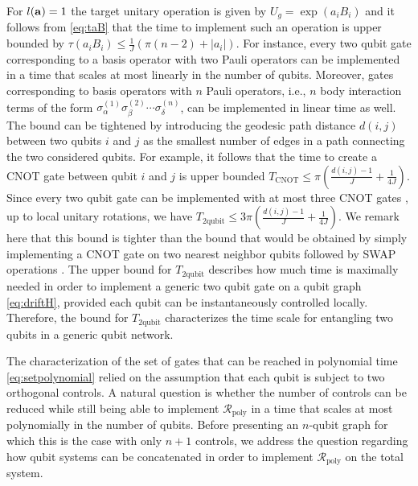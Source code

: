 \documentclass[aps,twocolumn,amsmath,amssymb,nofootinbib,superscriptaddress]{revtex4-1}
\begin{document}
 
 For $l(\bold{a})=1$ the target unitary operation is given by $U_{g}=\exp(a_{i}B_{i})$ and it follows from \eqref{eq:taB} that the time to implement such an operation is upper bounded by $\tau(a_{i}B_{i})\leq \frac{1}{J}(\pi(n-2)+|a_{i}|)$. For instance, every two qubit gate corresponding to a basis operator with two Pauli operators can be implemented in a time that scales at most linearly in the number of qubits. Moreover, gates corresponding to basis operators with $n$ Pauli operators, i.e., $n$ body interaction terms of the form $\sigma_{\alpha}^{(1)}\sigma_{\beta}^{(2)}\cdots\sigma_{\delta}^{(n)}$, can be implemented in linear time as well.
   The bound can be tightened by introducing the geodesic path distance $d(i,j)$ between two qubits $i$ and $j$ as the smallest number of edges in a path connecting the two considered qubits. For example, it follows that the time to create a CNOT gate between qubit $i$ and $j$ is upper bounded $T_{\text{CNOT}}\leq \pi\left(\frac{d(i,j)-1}{J}+\frac{1}{4J}\right)$. Since every two qubit gate can be implemented with at most three CNOT gates \cite{3CNOT}, up to local unitary rotations, we have
    $T_{\text{2qubit}}\leq 3\pi\left(\frac{ d(i,j)-1}{J}+\frac{1}{4J}	\right)$.
     We remark here that this bound is tighter than the bound that would be obtained by simply implementing a CNOT gate on two nearest neighbor qubits followed by SWAP operations \cite{ExactCalc1, ExactCalc2}. The upper bound for $T_{\text{2qubit}}$ describes how much time is maximally needed in order to implement a generic two qubit gate on a qubit graph \eqref{eq:driftH}, provided each qubit can be instantaneously controlled locally. Therefore, the bound for $T_{\text{2qubit}}$ characterizes the time scale for entangling two qubits in a generic qubit network. 
   
   The characterization of the set of gates that can be reached in polynomial time \eqref{eq:setpolynomial} relied on the assumption that each qubit is subject to two orthogonal controls. A natural question is whether the number of controls can be reduced while still being able to implement $\mathcal R_{\text{poly}}$ in a time that scales at most polynomially in the number of qubits. Before presenting an $n$-qubit graph for which this is the case with only $n+1$ controls, we address the question regarding how qubit systems can be concatenated in order to implement $\mathcal R_{\text{poly}}$ on the total system.
  
\end{document}
